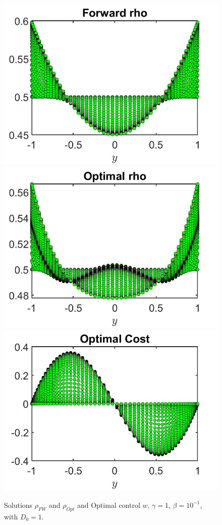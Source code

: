 \documentclass[11pt, a4paper]{article}
\theoremstyle{definition}
\begin{document}
\begin{figure}[h]
	\includegraphics[scale=0.3]{rhoFWD01a.jpg}	\includegraphics[scale=0.3]{rhoOptD01a.jpg}
	\includegraphics[scale=0.3]{wOptD01a.jpg}
	\caption{Solutions $\rho_{FW}$ and $\rho_{Opt}$ and Optimal control $w$, $\gamma = 1$, $\beta = 10^{-1}$, with $D_0 = 1$.}
	\label{rhoD01a}
\end{figure}
\end{document}
